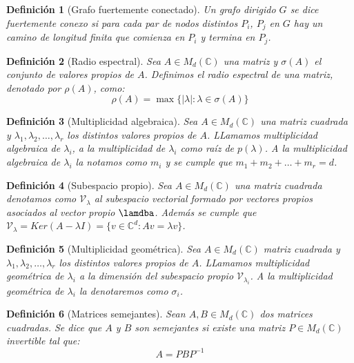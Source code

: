 \documentclass[size=a4, parskip=half, titlepage=false, toc=flat, toc=bib, 12pt]{scrartcl}
\theoremstyle{theorem-style}
\theoremstyle{definition-style}
\newtheorem{ndef}{Definición}[section]
\theoremstyle{remark-style}
\theoremstyle{example-style}
\theoremstyle{definition-style}
\theoremstyle{remark-style}
\begin{document}
\begin{ndef}[Grafo fuertemente conectado]
Un grafo dirigido $G$ se dice fuertemente conexo si para cada par de nodos distintos $P_i$, $P_j$ en $G$ hay un camino de longitud finita que comienza en $P_i$ y termina en $P_j$.
\end{ndef}

\begin{ndef}[Radio espectral]
Sea $A \in M_d(\mathbb{C})$ una matriz y $\sigma (A)$ el conjunto de valores propios de $A$. Definimos el radio espectral de una matriz, denotado por $\rho(A)$,  como:
$$\rho(A) = \max \{ | \lambda| : \lambda \in \sigma (A) \} $$
\end{ndef}

\begin{ndef}[Multiplicidad algebraica]
Sea $A \in M_d(\mathbb{C})$ una matriz cuadrada y $\lambda_1, \lambda_2, \dots, \lambda_r$ los distintos valores propios de $A$. LLamamos multiplicidad algebraica de $\lambda_i$, a la multiplicidad de $\lambda_i$ como raíz de $p(\lambda)$. A la multiplicidad algebraica de $\lambda_i$ la notamos como $m_i$ y se cumple que $m_1 + m_2 + \dots + m_r = d$.
\end{ndef}

\begin{ndef}[Subespacio propio]
Sea $A \in M_d(\mathbb{C})$ una matriz cuadrada denotamos como $\mathscr{V}_\lambda$ al subespacio vectorial formado por vectores propios asociados al vector propio $\lamdba$. Además se cumple que  $\mathscr{V}_\lambda = Ker(A - \lambda I) = \{ v \in \mathbb{C}^d : Av = \lambda v \}$.
\end{ndef}

\begin{ndef}[Multiplicidad geométrica]
Sea $A \in M_d(\mathbb{C})$ matriz cuadrada y $\lambda_1, \lambda_2, \dots, \lambda_r$ los distintos valores propios de $A$. LLamamos multiplicidad geométrica de $\lambda_i$ a la dimensión del subespacio propio $\mathscr{V}_\lambda_i$. A la multiplicidad geométrica de $\lambda_i$ la denotaremos como $\sigma_i$.
\end{ndef}

\begin{ndef}[Matrices semejantes]
Sean $A, B \in M_d(\mathbb{C})$ dos matrices cuadradas. Se dice que $A$ y $B$ son semejantes si existe una matriz $P \in M_d(\mathbb{C})$ invertible tal que:
$$A = P B P^{-1} $$
\end{ndef}
\end{document}
